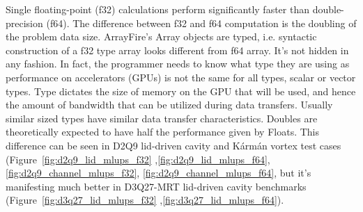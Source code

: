 Single floating-point (f32) calculations perform significantly faster than double-precision (f64). The difference between f32 and f64 computation is the doubling of the problem data size. ArrayFire's Array objects are typed, i.e. syntactic construction of a f32 type array looks different from f64 array. It's not hidden in any fashion. In fact, the programmer needs to know what type they are using as performance on accelerators (GPUs) is not the same for all types, scalar or vector types. Type dictates the size of memory on the GPU that will be used, and hence the amount of bandwidth that can be utilized during data transfers. Usually similar sized types have similar data transfer characteristics. Doubles are theoretically expected to have half the performance given by Floats. This difference can be seen in D2Q9 lid-driven cavity and Kármán vortex test cases (Figure~\ref{fig:d2q9_lid_mlups_f32} ,\ref{fig:d2q9_lid_mlups_f64}, \ref{fig:d2q9_channel_mlups_f32}, \ref{fig:d2q9_channel_mlups_f64}, but it's manifesting much better in D3Q27-MRT lid-driven cavity benchmarks (Figure~\ref{fig:d3q27_lid_mlups_f32} ,\ref{fig:d3q27_lid_mlups_f64}).

